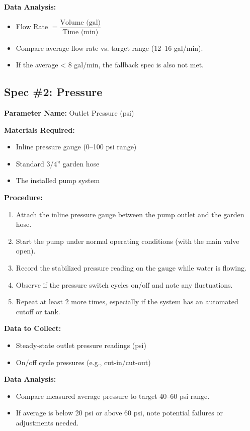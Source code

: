 \documentclass[12pt]{article}
\begin{document}
\noindent
\textbf{Data Analysis:}
\begin{itemize}
    \item Flow Rate $= \dfrac{\text{Volume (gal)}}{\text{Time (min)}}$
    \item Compare average flow rate vs. target range (12--16 gal/min).
    \item If the average < 8 gal/min, the fallback spec is also not met.
\end{itemize}

\vspace{1em}
\subsection*{Spec \#2: Pressure}
\textbf{Parameter Name:} Outlet Pressure (psi)

\noindent
\textbf{Materials Required:}
\begin{itemize}
    \item Inline pressure gauge (0--100 psi range)
    \item Standard 3/4'' garden hose
    \item The installed pump system
\end{itemize}

\noindent
\textbf{Procedure:}
\begin{enumerate}
    \item Attach the inline pressure gauge between the pump outlet and the garden hose.
    \item Start the pump under normal operating conditions (with the main valve open).
    \item Record the stabilized pressure reading on the gauge while water is flowing.
    \item Observe if the pressure switch cycles on/off and note any fluctuations.
    \item Repeat at least 2 more times, especially if the system has an automated cutoff or tank.
\end{enumerate}

\noindent
\textbf{Data to Collect:}
\begin{itemize}
    \item Steady-state outlet pressure readings (psi)
    \item On/off cycle pressures (e.g., cut-in/cut-out)
\end{itemize}

\noindent
\textbf{Data Analysis:}
\begin{itemize}
    \item Compare measured average pressure to target 40--60 psi range.
    \item If average is below 20 psi or above 60 psi, note potential failures or adjustments needed.
\end{itemize}
\end{document}
